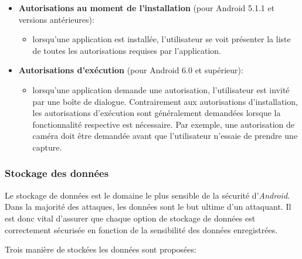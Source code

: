 \documentclass[
  french,
  paper=a4,
  ,captions=tableheading
]{scrartcl}
\providecommand{\tightlist}{%
  \setlength{\itemsep}{0pt}\setlength{\parskip}{0pt}}
\begin{document}
\begin{itemize}
\tightlist
\item
  \textbf{Autorisations au moment de l'installation} (pour Android 5.1.1
  et versions antérieures):

  \begin{itemize}
  \tightlist
  \item
    lorsqu'une application est installée, l'utilisateur se voit
    présenter la liste de toutes les autorisations requises par
    l'application.
  \end{itemize}
\item
  \textbf{Autorisations d'exécution} (pour Android 6.0 et supérieur):

  \begin{itemize}
  \tightlist
  \item
    lorsqu'une application demande une autorisation, l'utilisateur est
    invité par une boîte de dialogue. Contrairement aux autorisations
    d'installation, les autorisations d'exécution sont généralement
    demandées lorsque la fonctionnalité respective est nécessaire. Par
    exemple, une autorisation de caméra doit être demandée avant que
    l'utilisateur n'essaie de prendre une capture.
  \end{itemize}
\end{itemize}

\hypertarget{stockage-des-donnuxe9es}{%
\subsubsection{Stockage des données}\label{stockage-des-donnuxe9es}}

Le stockage de données est le domaine le plus sensible de la sécurité
d'\emph{Android}. Dans la majorité des attaques, les données sont le but
ultime d'un attaquant. Il est donc vital d'assurer que chaque option de
stockage de données est correctement sécurisée en fonction de la
sensibilité des données enregistrées.

Trois manière de stockées les données sont proposées:
\end{document}
